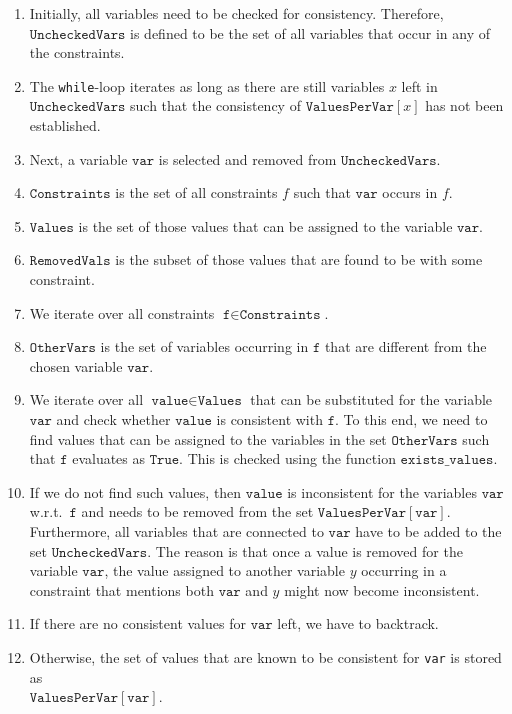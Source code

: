 \begin{enumerate}
\item Initially, all variables need to be checked for consistency.  Therefore, $\texttt{UncheckedVars}$
      is defined to be the set of all variables that occur in any of the constraints.
\item The \texttt{while}-loop iterates as long as there are still variables $x$ left in $\texttt{UncheckedVars}$
      such that the consistency of $\texttt{ValuesPerVar}[x]$ has not been established.
\item Next, a variable $\texttt{var}$ is selected and removed from $\texttt{UncheckedVars}$. 
\item $\texttt{Constraints}$ is the set of all constraints $f$ such that $\texttt{var}$ occurs in $f$.
\item $\texttt{Values}$ is the set of those values that can be assigned to the variable $\texttt{var}$.
\item $\texttt{RemovedVals}$ is the subset of those values that are found to be  with some
      constraint. 
\item We iterate over all constraints $\texttt{f} \in \texttt{Constraints}$.
\item $\texttt{OtherVars}$ is the set of variables occurring in $\texttt{f}$ that are different from 
      the chosen variable $\texttt{var}$.
\item We iterate over all $\texttt{value} \in \texttt{Values}$ that can be substituted for the variable $\texttt{var}$
      and check whether $\texttt{value}$ is consistent with $\texttt{f}$.   To this end, we need to find values
      that can be assigned to the variables in the set $\texttt{OtherVars}$ such that $\texttt{f}$ evaluates as
      $\texttt{True}$.  This is checked using the function $\texttt{exists\_values}$.
\item If we do not find such values, then $\texttt{value}$ is inconsistent for the variables
      $\texttt{var}$ w.r.t.~$\texttt{f}$ and needs to be removed from the set 
      $\texttt{ValuesPerVar}[\texttt{var}]$.  Furthermore, all variables that are connected to
      $\texttt{var}$ have to be added to the set $\texttt{UncheckedVars}$.  The reason is that once a
      value is removed for the variable $\texttt{var}$, the value assigned to another variable $y$ occurring in a
      constraint that mentions both $\texttt{var}$ and $y$ might now become inconsistent.
\item If there are no consistent values for $\texttt{var}$ left, we have to backtrack.
\item Otherwise, the set of values that are known to be consistent for \texttt{var} is stored
      as \\ $\texttt{ValuesPerVar}[\texttt{var}]$.
\end{enumerate}

